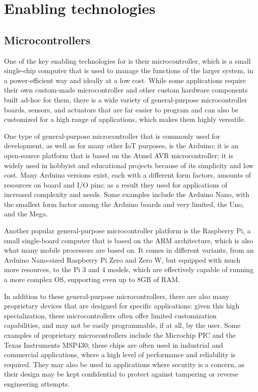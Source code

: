 \section{Enabling technologies}
\subsection{Microcontrollers}
One of the key enabling technologies for \ess is their microcontroller, which is a small single-chip computer that is used to manage the functions of the larger system, in a power-efficient way and ideally at a low cost. While some applications require their own custom-made microcontroller and other custom hardware components built ad-hoc for them, there is a wide variety of general-purpose microcontroller boards, sensors, and actuators that are far easier to program and can also be customized for a high range of applications, which makes them highly versatile.

One type of general-purpose microcontroller that is commonly used for \ess development, as well as for many other IoT purposes, is the Arduino; it is an open-source platform that is based on the Atmel AVR microcontroller; it is widely used in hobbyist and educational projects because of its simplicity and low cost. Many Arduino versions exist, each with a different form factors, amounts of resources on board and I/O pins; as a result they used for applications of increased complexity and needs. Some examples include the Arduino Nano, with the smallest form factor among the Arduino boards and very limited, the Uno, and the Mega.


Another popular general-purpose microcontroller platform is the Raspberry Pi, a small single-board computer that is based on the ARM architecture, which is also what many mobile processors are based on. It comes in different variants, from an Arduino Nano-sized Raspberry Pi Zero and Zero W, but equipped with much more resources, to the Pi 3 and 4 models, which are effectively capable of running a more complex OS, supporting even up to 8GB of RAM.

In addition to these general-purpose microcontrollers, there are also many proprietary devices that are designed for specific applications: given this high specialization, these microcontrollers often offer limited customization capabilities, and may not be easily programmable, if at all, by the user. Some examples of proprietary microcontrollers include the Microchip PIC and the Texas Instruments MSP430; these chips are often used in industrial and commercial applications, where a high level of performance and reliability is required. They may also be used in applications where security is a concern, as their design may be kept confidential to protect against tampering or reverse engineering attempts.

